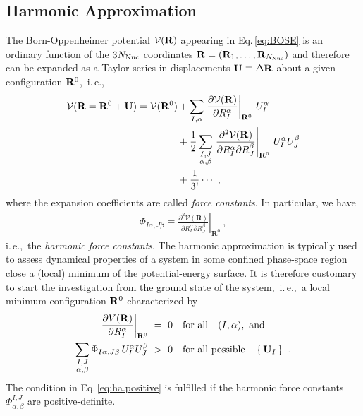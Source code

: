 \subsection{Harmonic Approximation}
The Born-Oppenheimer potential $\mathcal V ({\bf R})$ appearing in Eq.\,\eqref{eq:BOSE} is an ordinary function of the $3 N_{\rm Nuc}$ coordinates ${\bf R} = ({\bf R}_1, \ldots, {\bf R}_{N_{\rm Nuc}})$ and therefore can be expanded as a Taylor series in displacements ${\bf U} \equiv \Delta {\bf R}$ about a given configuration ${\bf R}^0$,~i.\,e.,
\begin{align}
\begin{split}
  \mathcal V ({\bf R} = {\bf R}^0 + {\bf U})
    = \mathcal V ({\bf R}^0)
    &+ \sum_{I, \alpha} 
      \left. \frac{\partial \mathcal V({\bf R})}{\partial R^\alpha_I} 
      \right\vert_{{\bf R}^0}
    \,U^\alpha_I
    \\
    &
    + \frac{1}{2}
    \sum_{\substack{I, J \\ \alpha, \beta}}
    \left.\frac{\partial^{2} \mathcal{V}(\mathbf{R})}{\partial R_{I}^{\alpha} \partial R_{J}^{\beta}}\right|_{\mathbf{R}^{0}}
    \, U_I^\alpha U_J^\beta
    \\
    &+\frac{1}{3!}\cdots ~,
\end{split}
\end{align}
where the expansion coefficients are called \emph{force constants}. In particular, we have
\begin{align}
  \Phi_{I \alpha, J \beta}
  \equiv \left.\frac{\partial^{2} \mathcal{V}(\mathbf{R})}{\partial R_{I}^{\alpha} \partial R_{J}^{\beta}}\right|_{\mathbf{R}^{0}}~,
  \label{eq:FC2}
\end{align}
i.\,e.,~the \emph{harmonic force constants}. The harmonic approximation is typically used to assess dynamical properties of a system in some confined phase-space region close a (local) minimum of the potential-energy surface. It is therefore customary to start the investigation from the ground state of the system,~i.\,e.,~a local minimum configuration ${\bf R}^0$ characterized by
\begin{align}
	\left. \frac{\partial V({\bf R})}{\partial R^\alpha_I} 
	\right\vert_{{\bf R}^0} 
		&~=~ 0 \quad\text{for all}\quad (I, \alpha),~\text{and} \\
	\sum_{\substack{I, J \\ \alpha, \beta}}
	\Phi_{I \alpha, J \beta}
	\, U_I^\alpha U_J^\beta
		&~>~ 0 \quad\text{for all possible}\quad \set{{\bf U}_I}~.
	\label{eq:ha.positive}
\end{align}
The condition in Eq.\,\eqref{eq:ha.positive} is fulfilled if the harmonic force constants $\Phi_{\alpha, \beta}^{I, J}$ are positive-definite.

